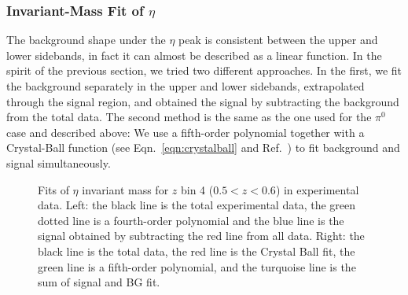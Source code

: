 \subsubsection{\texorpdfstring{Invariant-Mass Fit of $\eta$}{eta fit} }
\label{sec:etafitsection}
The background shape under the $\eta$ peak is consistent between the upper and lower sidebands, in fact it can almost be described as a linear function. In the spirit of the previous section, we tried two different approaches. 
In the first, we fit the background separately in the upper and lower sidebands, 
extrapolated through the signal region, and obtained the signal by subtracting the background from the total data. 
The second method is the same as the one used for the $\pi^0$ case and described above: 
We use a fifth-order polynomial together with a Crystal-Ball function (see Eqn.~\eqref{eqn:crystalball} and Ref.~\cite{CrystalBallFunc}) to fit background and signal simultaneously. 


\begin{figure}
\centering     %
{}
\caption[Fits of $\eta$ invariant mass for $z$ bin 4 in experimental data]{Fits of $\eta$ invariant mass for $z$ bin 4 ($0.5<z<0.6$) in experimental data. Left: the black line is the total experimental data, the green dotted line is a fourth-order polynomial and the blue line is the signal obtained by subtracting the red line from all data. Right: the black line is the total data, the red line is the Crystal Ball fit, the green line is a fifth-order polynomial, and the turquoise line is the sum of signal and BG fit.}
\label{fig:eta_fit}
\end{figure}

